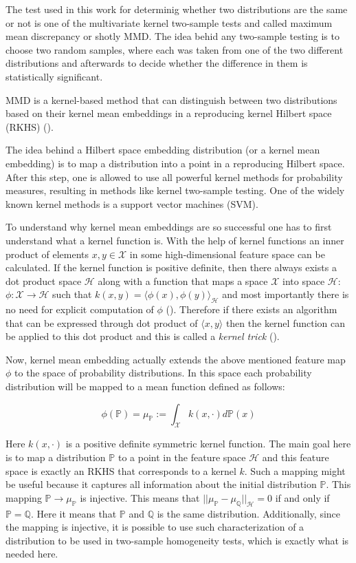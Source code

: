 The test used in this work for determinig whether two distributions are the same or not is one of the multivariate kernel two-sample tests and called maximum mean discrepancy or shotly MMD. The idea behid any two-sample testing is to choose two random samples, where each was taken from one of the two different distributions and afterwards to decide whether the difference in them is statistically significant. 

MMD is a kernel-based method that can distinguish between two distributions based on their kernel mean embeddings  in a reproducing kernel Hilbert space (RKHS) (\cite{Rabanser_2018}).

The idea behind a Hilbert space embedding distribution (or a kernel mean embedding) is to map a distribution into a point in a reproducing Hilbert space. After this step, one is allowed to use all powerful kernel methods for probability measures, resulting in methods like kernel two-sample testing. One of the widely known kernel methods is a support vector machines (SVM).

To understand why kernel mean embeddings are so successful one has to first understand what a kernel function is. With the help of kernel functions an inner product of elements $x, y \in \mathcal{X}$ in some high-dimensional feature space can be calculated. If the kernel function is positive definite, then there always exists a dot product space $\mathscr{H}$ along with a function that maps a space $\mathcal{X}$ into space $\mathscr{H}$: $\phi : \mathcal{X} \rightarrow \mathscr{H}$ such that $k(x, y) = {\langle\phi(x), \phi(y)\rangle}_{\mathscr{H}}$ and most importantly there is no need for explicit computation of $\phi$ (\cite{Smola_2002}). Therefore if there exists an algorithm that can be expressed through dot product of $\langle x, y \rangle$ then the kernel function can be applied to this dot product and this is called a \textit{kernel trick} (\cite{Smola_2002}).

Now, kernel mean embedding actually extends the above mentioned feature map $\phi$ to the space of probability distributions. In this space each probability distribution will be mapped to a mean function defined as follows:

\begin{equation}
    \phi(\mathds{P}) = \mu_{\mathds{P}} := \int_{\mathcal{X}}k(x, \cdot)d\mathds{P}(x)
\end{equation}

Here $k(x, \cdot)$ is a positive definite symmetric kernel function. The main goal here is to map a distribution $\mathds{P}$ to a point in the feature space $\mathscr{H}$ and this feature space is exactly an RKHS that corresponds to a kernel $k$. Such a mapping might be useful because it captures all information about the initial distribution $\mathds{P}$. This mapping $\mathds{P} \rightarrow \mu_\mathds{P}$ is injective. This means that $||\mu_\mathds{P} - \mu_\mathds{Q}||_{\mathscr{H}} = 0$ if and only if $\mathds{P} = \mathds{Q}$. Here it means that $\mathds{P}$ and $\mathds{Q}$ is the same distribution. Additionally, since the mapping is injective, it is possible to use such characterization of a distribution to be used in two-sample homogeneity tests, which is exactly what is needed here. 


